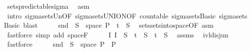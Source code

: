 \begin{isabellebody}
\ sets{\isacharunderscore}{\kern0pt}predictable{\isacharunderscore}{\kern0pt}sigma\ \isamarkupfalse%
\ asm\ \isamarkupfalse%
\ {\isacharparenleft}{\kern0pt}intro\ sigma{\isacharunderscore}{\kern0pt}sets{\isacharunderscore}{\kern0pt}Un{\isacharbrackleft}{\kern0pt}OF\ sigma{\isacharunderscore}{\kern0pt}sets{\isacharunderscore}{\kern0pt}UNION{\isacharbrackleft}{\kern0pt}OF\ countable{\isacharbrackright}{\kern0pt}\ sigma{\isacharunderscore}{\kern0pt}sets{\isachardot}{\kern0pt}Basic{\isacharbrackright}{\kern0pt}\ sigma{\isacharunderscore}{\kern0pt}sets{\isachardot}{\kern0pt}Basic{\isacharparenright}{\kern0pt}\ blast{\isacharplus}{\kern0pt}\isanewline
\ \ \isamarkupfalse%
\ \isamarkupfalse%
\ {\isachardoublequoteopen}snd\ {\isacharminus}{\kern0pt}{\isacharbackquote}{\kern0pt}\ S\ {\isasyminter}\ space\ {\isasymSigma}\isactrlsub P\ {\isacharequal}{\kern0pt}\ {\isacharbraceleft}{\kern0pt}t\ {\isasymtimes}\ S{\isachardoublequoteclose}\ \isamarkupfalse%
\ sets{\isachardot}{\kern0pt}sets{\isacharunderscore}{\kern0pt}into{\isacharunderscore}{\kern0pt}space{\isacharbrackleft}{\kern0pt}OF\ asm{\isacharbrackright}{\kern0pt}\ \isamarkupfalse%
\ {\isacharparenleft}{\kern0pt}fastforce\ simp\ add{\isacharcolon}{\kern0pt}\ space{\isacharunderscore}{\kern0pt}F{\isacharparenright}{\kern0pt}\isanewline
\ \ \isamarkupfalse%
\ \isamarkupfalse%
\ {\isachardoublequoteopen}{\isacharparenleft}{\kern0pt}{\isasymUnion}I{\isasymin}{\isasymI}{\isachardot}{\kern0pt}\ I\ {\isasymtimes}\ S{\isacharparenright}{\kern0pt}\ {\isasymunion}\ {\isacharbraceleft}{\kern0pt}t\ {\isasymtimes}\ S\ {\isacharequal}{\kern0pt}\ {\isacharbraceleft}{\kern0pt}t\ {\isasymtimes}\ S{\isachardoublequoteclose}\ \isamarkupfalse%
\ assms{\isacharparenleft}{\kern0pt}{}{\isacharcomma}{\kern0pt}{}{\isacharparenright}{\kern0pt}\ \isamarkupfalse%
\ ivl{\isacharunderscore}{\kern0pt}disj{\isacharunderscore}{\kern0pt}un{\isacharparenleft}{\kern0pt}{}{\isacharparenright}{\kern0pt}\ \isamarkupfalse%
\ fastforce\isanewline
\ \ \isamarkupfalse%
\ \isamarkupfalse%
\ {\isachardoublequoteopen}snd\ {\isacharminus}{\kern0pt}{\isacharbackquote}{\kern0pt}\ S\ {\isasyminter}\ space\ {\isasymSigma}\isactrlsub P\ {\isasymin}\ {\isasymSigma}\isactrlsub P{\isachardoublequoteclose}\ \isamarkupfalse%

\end{isabellebody}
